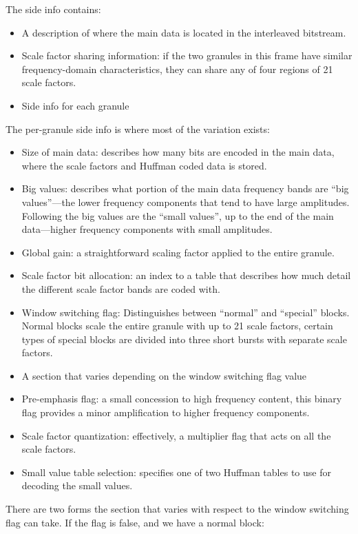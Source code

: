 \documentclass{thesis}
\begin{document}
	The side info contains:
	
\begin{itemize}
	\item A description of where the main data is located in the interleaved bitstream.
	\item Scale factor sharing information: if the two granules in this frame have similar frequency-domain characteristics, they can share any of four regions of 21 scale factors.
	\item Side info for each granule
\end{itemize}

	The per-granule side info is where most of the variation exists:
	
\begin{itemize}
	\item Size of main data: describes how many bits are encoded in the main data, where the scale factors and Huffman coded data is stored.
	\item Big values: describes what portion of the main data frequency bands are ``big values''---the lower frequency components that tend to have large amplitudes. Following the big values are the ``small values'', up to the end of the main data---higher frequency components with small amplitudes.
	\item Global gain: a straightforward scaling factor applied to the entire granule.
	\item Scale factor bit allocation: an index to a table that describes how much detail the different scale factor bands are coded with.
	\item Window switching flag: Distinguishes between ``normal'' and ``special'' blocks. Normal blocks scale the entire granule with up to 21 scale factors, certain types of special blocks are divided into three short bursts with separate scale factors.
	\item A section that varies depending on the window switching flag value
	\item Pre-emphasis flag: a small concession to high frequency content, this binary flag provides a minor amplification to higher frequency components.
	\item Scale factor quantization: effectively, a multiplier flag that acts on all the scale factors.
	\item Small value table selection: specifies one of two Huffman tables to use for decoding the small values.
\end{itemize}

	There are two forms the section that varies with respect to the window switching flag can take. If the flag is false, and we have a normal block:
	
\end{document}
